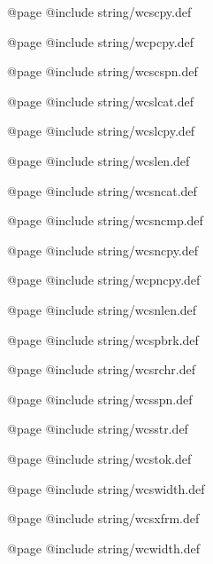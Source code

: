 @page
@include string/wcscpy.def

@page
@include string/wcpcpy.def

@page
@include string/wcscspn.def

@page
@include string/wcslcat.def

@page
@include string/wcslcpy.def

@page
@include string/wcslen.def

@page
@include string/wcsncat.def

@page
@include string/wcsncmp.def

@page
@include string/wcsncpy.def

@page
@include string/wcpncpy.def

@page
@include string/wcsnlen.def

@page
@include string/wcspbrk.def

@page
@include string/wcsrchr.def

@page
@include string/wcsspn.def

@page
@include string/wcsstr.def

@page
@include string/wcstok.def

@page
@include string/wcswidth.def

@page
@include string/wcsxfrm.def

@page
@include string/wcwidth.def

